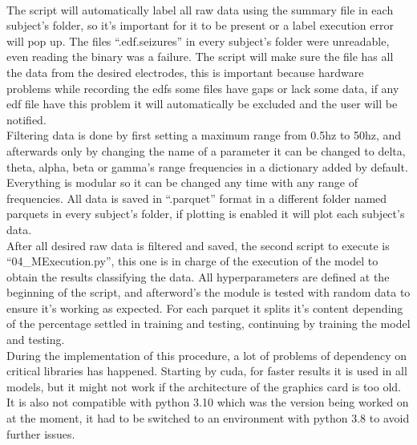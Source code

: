 \leavevmode\\
The script will automatically label all raw data using the summary file in each subject’s folder, so it’s important for it to be present or a label execution error will pop up. The files “.edf.seizures” in every subject’s folder were unreadable, even reading the binary was a failure. The script will make sure the file has all the data from the desired electrodes, this is important because hardware problems while recording the edfs some files have gaps or lack some data, if any edf file have this problem it will automatically be excluded and the user will be notified.
\\
Filtering data is done by first setting a maximum range from 0.5hz to 50hz, and afterwards only by changing the name of a parameter it can be changed to delta, theta, alpha, beta or gamma’s range frequencies in a dictionary added by default. Everything is modular so it can be changed any time with any range of frequencies. All data is saved in “.parquet” format in a different folder named parquets in every subject’s folder, if plotting is enabled it will plot each subject’s data.
\\
After all desired raw data is filtered and saved, the second script to execute is “04\_MExecution.py”, this one is in charge of the execution of the model to obtain the results classifying the data. All hyperparameters are defined at the beginning of the script, and afterword’s the module is tested with random data to ensure it’s working as expected. For each parquet it splits it’s content depending of the percentage settled in training and testing, continuing by training the model and testing.
\\
During the implementation of this procedure, a lot of problems of dependency on critical libraries has happened. Starting by cuda, for faster results it is used in all models, but it might not work if the architecture of the graphics card is too old. It is also not compatible with python 3.10 which was the version being worked on at the moment, it had to be switched to an environment with python 3.8 to avoid further issues.
\\